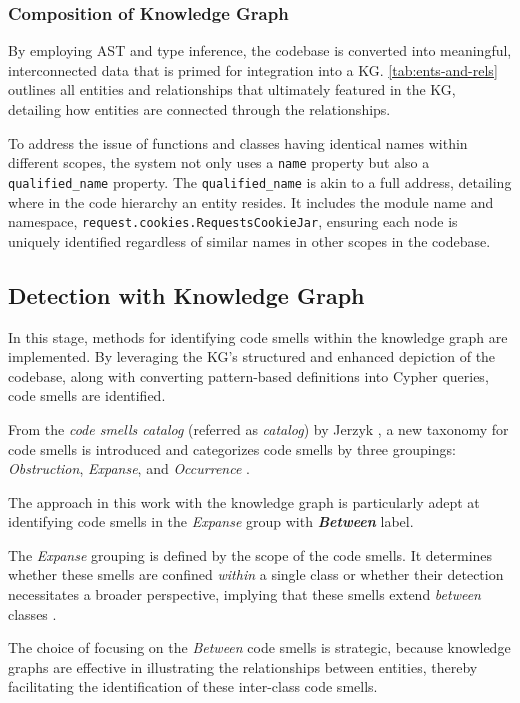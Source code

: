 \subsubsection{Composition of Knowledge Graph}
By employing AST and type inference, the codebase is converted into meaningful, interconnected data that is primed for integration into a KG. \autoref{tab:ents-and-rels} outlines all entities and relationships that ultimately featured in the KG, detailing how entities are connected through the relationships.

To address the issue of functions and classes having identical names within different scopes, the system not only uses a \texttt{name} property but also a \texttt{qualified\_name} property. The \texttt{qualified\_name} is akin to a full address, detailing where in the code hierarchy an entity resides. It includes the module name and namespace, \eg \texttt{request.cookies.RequestsCookieJar}, ensuring each node is uniquely identified regardless of similar names in other scopes in the codebase. 





\subsection{Detection with Knowledge Graph}
In this stage, methods for identifying code smells within the knowledge graph are implemented. By leveraging the KG's structured and enhanced depiction of the codebase, along with converting pattern-based definitions into Cypher queries, code smells are identified.


From the \textit{code smells catalog} (referred as \textit{catalog}) by Jerzyk \etal, a new taxonomy for code smells is introduced and categorizes code smells by three groupings: \textit{Obstruction}, \textit{Expanse}, and \textit{Occurrence} \cite{Jerzyk_2023}. 

The approach in this work with the knowledge graph is particularly adept at identifying code smells in the \textit{Expanse} group with \textit{\textbf{Between}} label. 

The \textit{Expanse} grouping is defined by the scope of the code smells. It determines whether these smells are confined \textit{within} a single class or whether their detection necessitates a broader perspective, implying that these smells extend \textit{between} classes \cite{Jerzyk_2023}.

The choice of focusing on the \textit{Between} code smells is strategic, because knowledge graphs are effective in illustrating the relationships between entities, thereby facilitating the identification of these inter-class code smells.


